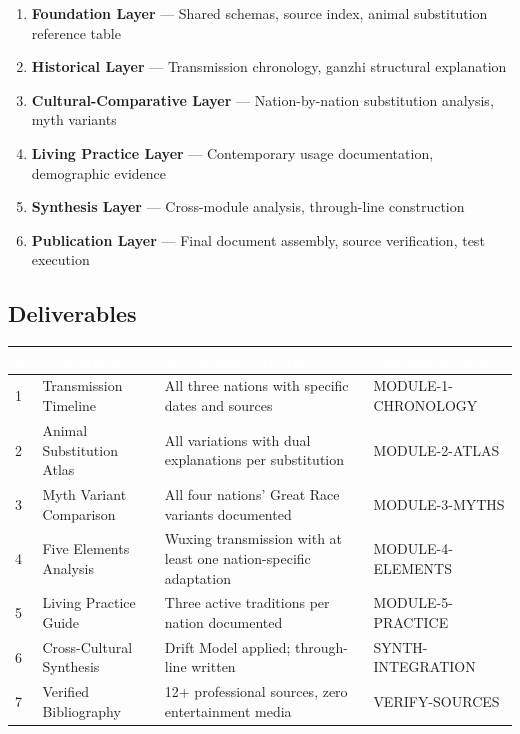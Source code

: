 \documentclass[11pt,letterpaper]{article}
\newcommand{\tableheader}[1]{\textbf{\sffamily\textcolor{white}{#1}}}
\begin{document}
\begin{enumerate}[leftmargin=2em]
  \item \textbf{Foundation Layer} --- Shared schemas, source index, animal substitution reference table
  \item \textbf{Historical Layer} --- Transmission chronology, ganzhi structural explanation
  \item \textbf{Cultural-Comparative Layer} --- Nation-by-nation substitution analysis, myth variants
  \item \textbf{Living Practice Layer} --- Contemporary usage documentation, demographic evidence
  \item \textbf{Synthesis Layer} --- Cross-module analysis, through-line construction
  \item \textbf{Publication Layer} --- Final document assembly, source verification, test execution
\end{enumerate}

\subsection{Deliverables}

\begin{center}
\begin{tabularx}{\textwidth}{C{0.5cm}L{3.5cm}L{4cm}L{3.5cm}}
\toprule
{}
\tableheader{\#} & \tableheader{Deliverable} & \tableheader{Acceptance Criteria} & \tableheader{Component Spec} \\
 & Transmission Timeline & All three nations with specific dates and sources & MODULE-1-CHRONOLOGY \\
2 & Animal Substitution Atlas & All variations with dual explanations per substitution & MODULE-2-ATLAS \\
3 & Myth Variant Comparison & All four nations' Great Race variants documented & MODULE-3-MYTHS \\
4 & Five Elements Analysis & Wuxing transmission with at least one nation-specific adaptation & MODULE-4-ELEMENTS \\
5 & Living Practice Guide & Three active traditions per nation documented & MODULE-5-PRACTICE \\
6 & Cross-Cultural Synthesis & Drift Model applied; through-line written & SYNTH-INTEGRATION \\
7 & Verified Bibliography & 12+ professional sources, zero entertainment media & VERIFY-SOURCES \\
\bottomrule
\end{tabularx}
\end{center}
\end{document}
